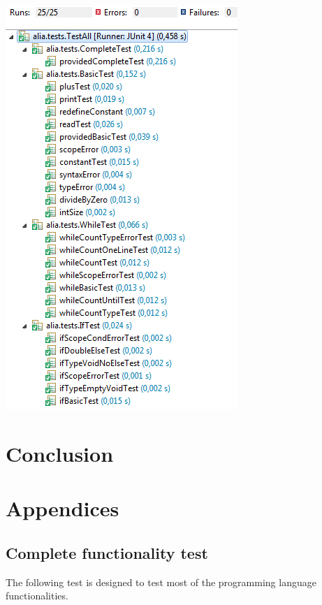 \documentclass[paper=a4, fontsize=11pt]{article}
\numberwithin{equation}{section}		%
\numberwithin{figure}{section}			%
\numberwithin{table}{section}				%
\begin{document}
\begin{center}
\includegraphics[scale=0.5]{images/testresults.png}
\end{center}



\section{Conclusion}

\newpage
\section{Appendices}


\subsection{Complete functionality test}
The following test is designed to test most of the programming language functionalities.
\end{document}
